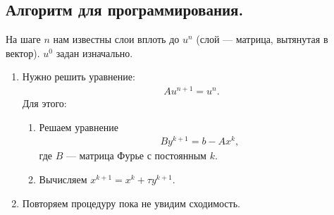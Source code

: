 \documentclass[14pt,a4paper]{extarticle}
\newcommand{\1}{\mathbbm{1}}
\begin{document}
\subsection{Алгоритм для программирования.}
На шаге $n$ нам известны слои вплоть до $u^n$ (слой --- матрица, вытянутая в вектор). $u^0$ задан изначально. 
\begin{enumerate} 
    \item Нужно решить уравнение:
    \begin{align*}
        A u^{n+1} = u^n.
    \end{align*}
    Для этого:
    \begin{enumerate}
        \item Решаем уравнение 
        \begin{align*}
            B y^{k+1} = b - A x^k,
        \end{align*}
        где $B$ --- матрица Фурье с постоянным $k$.
        \item Вычисляем $x^{k+1}=x^k + \tau y^{k+1}$.
    \end{enumerate}
    \item Повторяем процедуру пока не увидим сходимость.
\end{enumerate}
 
\end{document}
